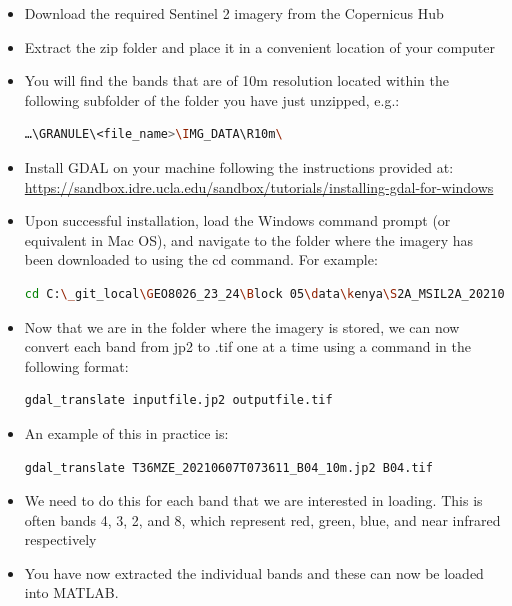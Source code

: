 \documentclass[11pt,onecolumn,a4paper,notitlepage]{article}
\begin{document}
\begin{itemize}
\item {Download the required Sentinel 2 imagery from the Copernicus Hub}

\item {Extract the zip folder and place it in a convenient location of your computer}

\item {You will find the bands that are of 10m resolution located within the following subfolder of the folder you have just unzipped, e.g.:

\begin{lstlisting}[language=bash]
…\GRANULE\<file_name>\IMG_DATA\R10m\
\end{lstlisting}
}

\item {Install GDAL on your machine following the instructions provided at: \url{https://sandbox.idre.ucla.edu/sandbox/tutorials/installing-gdal-for-windows}}

\item {Upon successful installation, load the Windows command prompt (or equivalent in Mac OS), and navigate to the folder where the imagery has been downloaded to using the cd command. For example:
 
\begin{lstlisting}[language=bash]
cd C:\_git_local\GEO8026_23_24\Block 05\data\kenya\S2A_MSIL2A_20210607T073611_N0300_R092_T36MZE_20210607T101427.SAFE\GRANULE\L2A_T36MZE_A031120_20210607T075618\IMG_DATA\R10m
\end{lstlisting}
}

\item {Now that we are in the folder where the imagery is stored, we can now convert each band from jp2 to .tif one at a time using a command in the following format:
\begin{lstlisting}[language=bash]
gdal_translate inputfile.jp2 outputfile.tif
\end{lstlisting}
}

\item {An example of this in practice is:
\begin{lstlisting}[language=bash]
gdal_translate T36MZE_20210607T073611_B04_10m.jp2 B04.tif
\end{lstlisting}
}

\item {We need to do this for each band that we are interested in loading. This is often bands 4, 3, 2, and 8, which represent red, green, blue, and near infrared respectively}

\item {You have now extracted the individual bands and these can now be loaded into MATLAB.}

\end{itemize}
\end{document}
